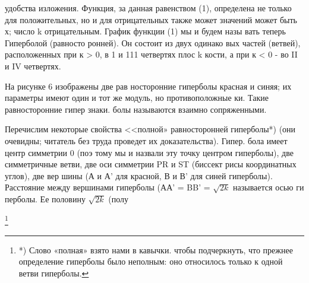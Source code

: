 \documentclass{article}
\newenvironment{Figure}
  {\par\medskip\noindent\minipage{\linewidth}}
  {\endminipage\par\medskip}
\begin{document}
\begin{multicols}{2}
\begin{Figure}
\end{Figure}

\lipsum
удобства изложения. Функция, за данная равенством (1), определена не только для положительных, но и для отрицательных также может значений может быть х; число k отрицательным. График функции (1) мы и будем назы вать теперь Гиперболой (равносто ронней). Он состоит из двух одинако вых частей (ветвей), расположенных при к > 0, в 1 и 111 четвертях плос k кости, а при к < 0 - во II и IV четвертях. \par
На рисунке 6 изображены две рав носторонние гиперболы красная и синяя; их параметры имеют один и тот же модуль, но противоположные ки. Такие равносторонние гипер знаки. болы называются взаимно сопряженными. \par
Перечислим некоторые свойства <<полной» равносторонней гиперболы*) (они очевидны; читатель без труда проведет их доказательства). Гипер. бола имеет центр симметрии 0 (поэ тому мы и назвали эту точку центром гиперболы), две симметричные ветви, две оси симметрии PR и ST (биссект рисы координатных углов), две вер шины (А и А' для красной, В и В' для синей гиперболы). Расстояние между вершинами гиперболы (АА' =
BB' = \(\sqrt{2k}\)  называется осью ги перболы. Ее половину \(\sqrt{2k}\) (полу \par
\lipsum\footnote{
*) Слово «полная» взято нами в кавычки. чтобы подчеркнуть, что прежнее определение гиперболы было неполным: оно относилось только к одной ветви гиперболы.}

\end{multicols}





\end{document}
